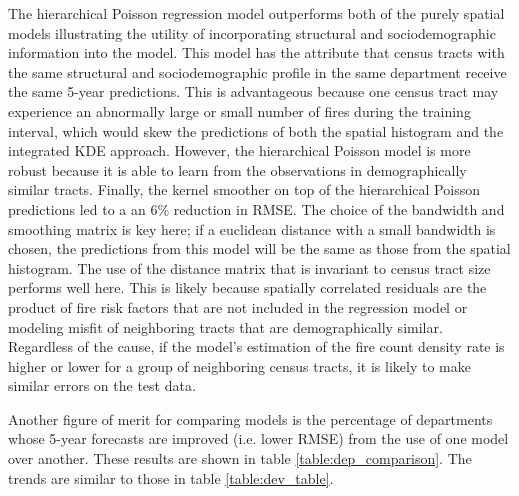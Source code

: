\documentclass{svjour3}
\begin{document}
    The hierarchical Poisson regression model outperforms both of the purely spatial models illustrating the utility of incorporating structural and sociodemographic information into the model. This model has the attribute that census tracts with the same structural and sociodemographic profile in the same department receive the same 5-year predictions. This is advantageous because one census tract may experience an abnormally large or small number of fires during the training interval, which would skew the predictions of both the spatial histogram and the integrated KDE approach. However, the hierarchical Poisson model is more robust because it is able to learn from the observations in demographically similar tracts. Finally, the kernel smoother on top of the hierarchical Poisson predictions led to a an 6\% reduction in RMSE. The choice of the bandwidth and smoothing matrix is key here; if a euclidean distance with a small bandwidth is chosen, the predictions from this model will be the same as those from the spatial histogram. The use of the distance matrix that is invariant to census tract size performs well here. This is likely because spatially correlated residuals are the product of fire risk factors that are not included in the regression model or modeling misfit of neighboring tracts that are demographically similar. Regardless of the cause, if the model's estimation of the fire count density rate is higher or lower for a group of neighboring census tracts, it is likely to make similar errors on the test data. 
    
    Another figure of merit for comparing models is the percentage of departments whose  5-year forecasts are improved (i.e. lower RMSE) from the use of one model over another. These results are shown in table \ref{table:dep_comparison}. The trends are similar to those in table \ref{table:dev_table}.
    

    
  
\end{document}
